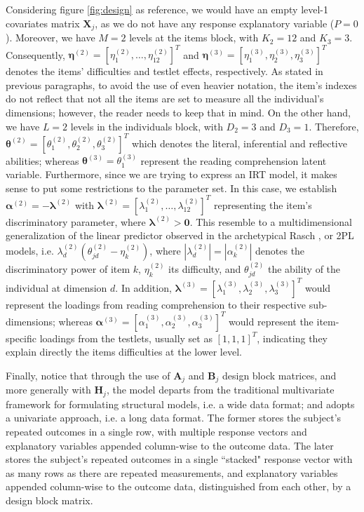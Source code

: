 Considering figure \ref{fig:design} as reference, we would have an empty level-1 covariates matrix $\mathbf{X}_{j}$, as we do not have any response explanatory variable ($P=0$). Moreover, we have $M=2$ levels at the items block, with $K_{2}=12$ and $K_{3}=3$. Consequently, $\pmb{\eta}^{(2)} = [ \eta_{1}^{(2)}, \dots, \eta_{12}^{(2)} ]^{T}$ and $\pmb{\eta}^{(3)} = [ \eta_{1}^{(3)}, \eta_{2}^{(3)}, \eta_{3}^{(3)} ]^{T}$ denotes the items' difficulties and testlet effects, respectively. As stated in previous paragraphs, to avoid the use of even heavier notation, the item's indexes do not reflect that not all the items are set to measure all the individual's dimensions; however, the reader needs to keep that in mind. On the other hand, we have $L=2$ levels in the individuals block, with $D_{2}=3$ and $D_{3}=1$. Therefore, $\pmb{\theta}^{(2)} = [ \theta_{1}^{(2)}, \theta_{2}^{(2)}, \theta_{3}^{(2)} ]^{T}$ which denotes the literal, inferential and reflective abilities; whereas $\pmb{\theta}^{(3)} = \theta_{1}^{(3)}$ represent the reading comprehension latent variable. Furthermore, since we are trying to express an IRT model, it makes sense to put some restrictions to the parameter set. In this case, we establish $\pmb{\alpha}^{(2)} = -\pmb{\lambda}^{(2)}$ with $ \pmb{\lambda}^{(2)} = [ \lambda_{1}^{(2)}, \dots, \lambda_{12}^{(2)} ]^{T}$ representing the item's discriminatory parameter, where $\pmb{\lambda}^{(2)} > \mathbf{0}$. This resemble to a multidimensional generalization of the linear predictor observed in the archetypical Rasch \cite{Rasch_1980}, or 2PL \cite{Lord_et_al_2008} models, i.e. $ \lambda^{(2)}_{d} (\theta^{(2)}_{jd} - \eta^{(2)}_{k} )$, where $| \lambda^{(2)}_{d} | = | \alpha^{(2)}_{k} |$ denotes the discriminatory power of item $k$, $\eta^{(2)}_{k}$ its difficulty, and $\theta^{(2)}_{jd}$ the ability of the individual at dimension $d$. In addition, $\pmb{\lambda}^{(3)} = [ \lambda_{1}^{(3)}, \lambda_{2}^{(3)}, \lambda_{3}^{(3)} ]^{T}$ would represent the loadings from reading comprehension to their respective sub-dimensions; whereas $\pmb{\alpha}^{(3)} = [ \alpha_{1}^{(3)}, \alpha_{2}^{(3)}, \alpha_{3}^{(3)} ]^{T}$ would represent the item-specific loadings from the testlets, usually set as $[1,1,1]^{T}$, indicating they explain directly the items difficulties at the lower level.

Finally, notice that through the use of $\mathbf{A}_{j}$ and $\mathbf{B}_{j}$ design block matrices, and more generally with $\mathbf{H}_{j}$, the model departs from the traditional multivariate framework for formulating structural models, i.e. a wide data format; and adopts a univariate approach, i.e. a long data format. The former stores the subject’s repeated outcomes in a single row, with multiple response vectors and explanatory variables appended column-wise to the outcome data. The later stores the subject’s repeated outcomes in a single ``stacked" response vector with as many rows as there are repeated measurements, and explanatory variables appended column-wise to the outcome data, distinguished from each other, by a design block matrix. 

